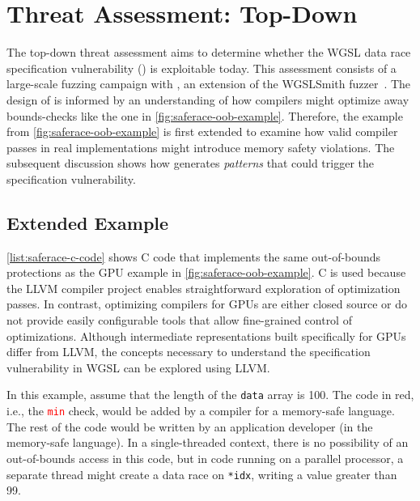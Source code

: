 \section{Threat Assessment: Top-Down \label{sec:saferace-assess-td}}

The top-down threat assessment aims to determine whether the WGSL data race specification vulnerability (\drsv) is exploitable today. This assessment consists of a large-scale fuzzing campaign with \wgslmemsmith, an extension of the WGSLSmith fuzzer~\cite{lecoeur2023reconditioning}. The design of \wgslmemsmith is informed by an understanding of how compilers might optimize away bounds-checks like the one in \myfig\ref{fig:saferace-oob-example}. Therefore, the example from \myfig\ref{fig:saferace-oob-example} is first extended to examine how valid compiler passes in real implementations might introduce memory safety violations. The subsequent discussion shows how \wgslmemsmith generates \textit{patterns} that could trigger the specification vulnerability.

\subsection{Extended Example \label{sec:saferace-extended-example}}

\mylistinglong\ref{list:saferace-c-code} shows C code that implements the same out-of-bounds protections as the GPU example in \myfig\ref{fig:saferace-oob-example}. C is used because the LLVM compiler project enables straightforward exploration of optimization passes. In contrast, optimizing compilers for GPUs are either closed source or do not provide easily configurable tools that allow fine-grained control of optimizations. Although intermediate representations built specifically for GPUs differ from LLVM, the concepts necessary to understand the specification vulnerability in WGSL can be explored using LLVM.

In this example, assume that the length of the \texttt{data} array is 100. The code in red, i.e., the \textcolor{red}{\texttt{min}} check, would be added by a compiler for a memory-safe language. The rest of the code would be written by an application developer (in the memory-safe language). In a single-threaded context, there is no possibility of an out-of-bounds access in this code, but in code running on a parallel processor, a separate thread might create a data race on \texttt{*idx}, writing a value greater than 99.


